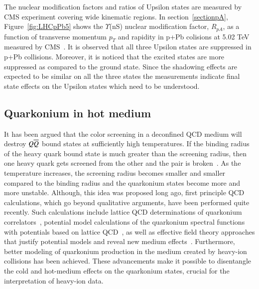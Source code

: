 The nuclear modification factors and ratios of Upsilon states are measured by CMS
experiment covering wide kinematic regions.
In section~\ref{sectionpA}, Figure~\ref{fig:LHCpPb5} shows the $\Upsilon$(nS) nuclear
modification factor, $R_{pA}$,  as a function of transverse momentum $p_{T}$ 
and rapidity in p+Pb colisions at 5.02 TeV measured by CMS~\cite{CMS:2022wfi}.
It is observed that all three Upsilon states are suppressed in p+Pb collisions.
Moreover, it is noticed that the excited states are more suppressed as compared
to the ground state.
Since the shadowing effects are expected to be similar on all the three states
the measurements indicate final state effects on the Upsilon states which need
to be understood. 


\subsection{Quarkonium in hot medium}
\label{sec:media_sec3}

It has been argued that the color screening 
in a deconfined QCD medium will destroy $Q \overline{Q}$ bound states
at sufficiently high temperatures. If the binding radius of the heavy
quark bound state is  much greater than the screening radius, then one heavy 
quark gets screened from the other and the pair is broken~\cite{Abdulsalam:2012bw}.
As the temperature 
increases, the screening radius becomes smaller and smaller compared to the 
binding radius and the quarkonium states become more and more unstable. 
Although, this idea was proposed long ago, first principle QCD calculations, 
which go beyond qualitative arguments, have been performed quite recently. 
Such calculations include lattice QCD determinations of quarkonium 
correlators~\cite{Umeda:2002vr,Asakawa:2003re,Datta:2003ww,Jakovac:2006sf,Aarts:2007pk},
potential model calculations 
of the quarkonium spectral functions with potentials based on lattice 
QCD~\cite{Digal:2001ue,Wong:2004zr,Mocsy:2005qw,Mocsy:2004bv,Alberico:2006vw,Cabrera:2006wh,Mocsy:2007yj,Mocsy:2007jz},
as well as effective 
field theory approaches that justify potential models and reveal new medium 
effects~\cite{Laine:2007qy,Laine:2007gj,Laine:2008cf,Brambilla:2008cx}.  
Furthermore, better modeling of 
quarkonium production in the medium created by heavy-ion collisions has 
been achieved.   These advancements make it possible to disentangle the cold
and hot-medium effects on the quarkonium states, crucial for the 
interpretation of heavy-ion data. 



